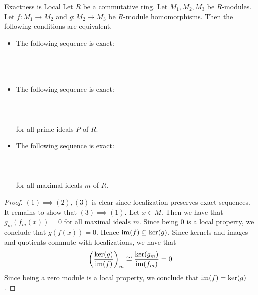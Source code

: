 \documentclass[a4paper]{article}
\begin{document}
\begin{prp}{Exactness is Local}{} Let $R$ be a commutative ring. Let $M_1,M_2,M_3$ be $R$-modules. Let $f:M_1\to M_2$ and $g:M_2\to M_3$ be $R$-module homomorphisms. Then the following conditions are equivalent. 
\begin{itemize}
\item The following sequence is exact: \\~\\
\\~\\
\item The following sequence is exact: \\~\\
\\~\\
for all prime ideals $P$ of $R$. 
\item The following sequence is exact: \\~\\
\\~\\
for all maximal ideals $m$ of $R$. 
\end{itemize} \tcbline
\begin{proof}
$(1)\implies(2),(3)$ is clear since localization preserves exact sequences. It remains to show that $(3)\implies(1)$. Let $x\in M$. Then we have that $g_m(f_m(x))=0$ for all maximal ideals $m$. Since being $0$ is a local property, we conclude that $g(f(x))=0$. Hence $\operatorname{im}(f)\subseteq\ker(g)$. Since kernels and images and quotients commute with localizations, we have that $$\left(\frac{\ker(g)}{\operatorname{im}(f)}\right)_m\cong\frac{\ker(g_m)}{\operatorname{im}(f_m)}=0$$ Since being a zero module is a local property, we conclude that $\operatorname{im}(f)=\ker(g)$. 
\end{proof}
\end{prp}
\end{document}

